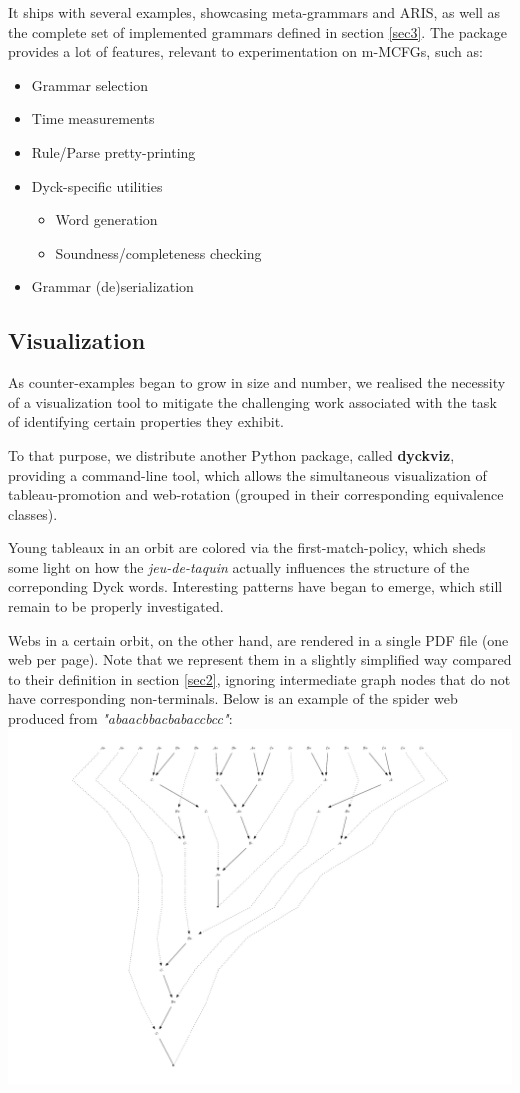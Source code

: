 \documentclass[nonatbib,numbers,10pt]{sigplanconf}
\newcommand{\w}[1]{\textit{"#1"}}
\begin{document}
It ships with several examples, showcasing meta-grammars and \textsc{ARIS}, as well as the complete set of implemented grammars defined in section \ref{sec3}. The package provides a lot of features, relevant to experimentation on m-MCFGs, such as:
\begin{itemize}
\item Grammar selection
\item Time measurements
\item Rule/Parse pretty-printing
\item Dyck-specific utilities
	\begin{itemize}
	\item Word generation
	\item Soundness/completeness checking
	\end{itemize}
\item Grammar (de)serialization
\end{itemize}

\subsection{Visualization}
As counter-examples began to grow in size and number, we realised the necessity of a visualization tool to mitigate the challenging work associated with the task of identifying certain properties they exhibit.

To that purpose, we distribute another Python package, called \textbf{dyckviz}, providing a command-line tool, which allows the simultaneous visualization of tableau-promotion and web-rotation (grouped in their corresponding equivalence classes).

Young tableaux in an orbit are colored via the first-match-policy, which sheds some light on how the \textit{jeu-de-taquin} actually influences the structure of the correponding Dyck words. Interesting patterns have began to emerge, which still remain to be properly investigated.

Webs in a certain orbit, on the other hand, are rendered in a single PDF file (one web per page). Note that we represent them in a slightly simplified way compared to their definition in section \ref{sec2}, ignoring intermediate graph nodes that do not have corresponding non-terminals. Below is an example of the spider web produced from \w{abaacbbacbabaccbcc}:
\medskip
\includegraphics[width=\columnwidth]{web.pdf}
\end{document}
